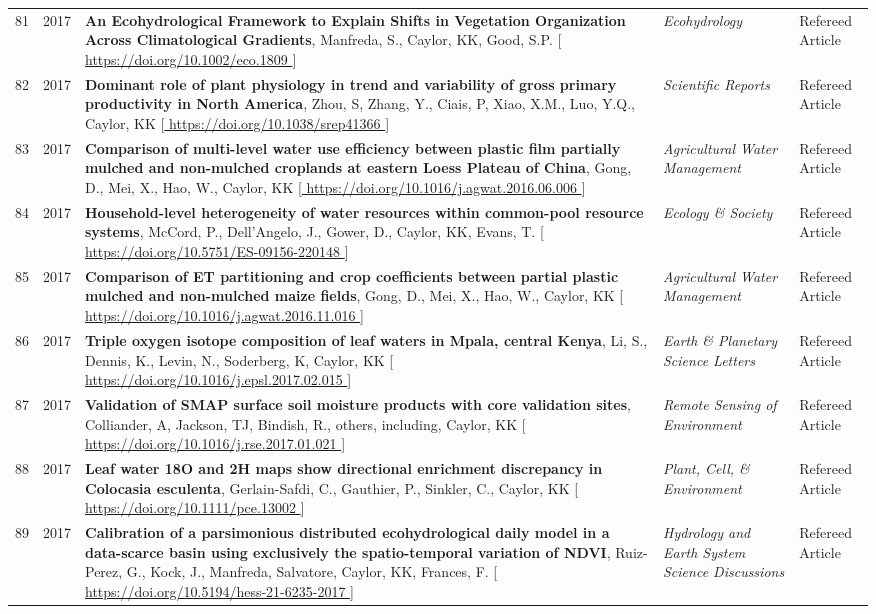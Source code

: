 \begin{supertabular}{lcp{8.25cm}p{4.75cm}p{1.75cm}}
81 & 2017 & {\bf An Ecohydrological Framework to Explain Shifts in Vegetation Organization Across Climatological Gradients}, Manfreda, S., Caylor, KK, Good, S.P. [\url{ https://doi.org/10.1002/eco.1809  }] & \emph{ Ecohydrology } & Refereed Article\\
82 & 2017 & {\bf Dominant role of plant physiology in trend and variability of gross primary productivity in North America}, Zhou, S, Zhang, Y., Ciais, P, Xiao, X.M., Luo, Y.Q., Caylor, KK [\url{ https://doi.org/10.1038/srep41366 }] & \emph{ Scientific Reports } & Refereed Article\\
83 & 2017 & {\bf Comparison of multi-level water use efficiency between plastic film partially mulched and non-mulched croplands at eastern Loess Plateau of China}, Gong, D., Mei, X., Hao, W., Caylor, KK [\url{ https://doi.org/10.1016/j.agwat.2016.06.006 }] & \emph{ Agricultural Water Management } & Refereed Article\\
84 & 2017 & {\bf Household-level heterogeneity of water resources within common-pool resource systems}, McCord, P., Dell'Angelo, J., Gower, D., Caylor, KK, Evans, T. [\url{ https://doi.org/10.5751/ES-09156-220148 }] & \emph{ Ecology \& Society } & Refereed Article\\
85 & 2017 & {\bf Comparison of ET partitioning and crop coefficients between partial plastic mulched and non-mulched maize fields}, Gong, D., Mei, X., Hao, W., Caylor, KK [\url{ https://doi.org/10.1016/j.agwat.2016.11.016 }] & \emph{ Agricultural Water Management } & Refereed Article\\
86 & 2017 & {\bf Triple oxygen isotope composition of leaf waters in Mpala, central Kenya}, Li, S., Dennis, K., Levin, N., Soderberg, K, Caylor, KK [\url{ https://doi.org/10.1016/j.epsl.2017.02.015 }] & \emph{ Earth \& Planetary Science Letters } & Refereed Article\\
87 & 2017 & {\bf Validation of SMAP surface soil moisture products with core validation sites}, Colliander, A, Jackson, TJ, Bindish, R., others, including, Caylor, KK [\url{ https://doi.org/10.1016/j.rse.2017.01.021 }] & \emph{ Remote Sensing of Environment } & Refereed Article\\
88 & 2017 & {\bf Leaf water 18O and 2H maps show directional enrichment discrepancy in Colocasia esculenta}, Gerlain-Safdi, C., Gauthier, P., Sinkler, C., Caylor, KK [\url{ https://doi.org/10.1111/pce.13002 }] & \emph{ Plant, Cell, \& Environment } & Refereed Article\\
89 & 2017 & {\bf Calibration of a parsimonious distributed ecohydrological daily model in a data-scarce basin using exclusively the spatio-temporal variation of NDVI}, Ruiz-Perez, G., Kock, J., Manfreda, Salvatore, Caylor, KK, Frances, F. [\url{ https://doi.org/10.5194/hess-21-6235-2017 }] & \emph{ Hydrology and Earth System Science Discussions } & Refereed Article\\

\end{supertabular}
